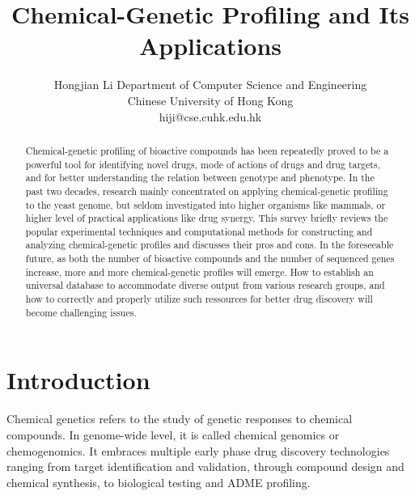 \documentclass[12pt,conference,compsocconf]{../IEEEtran}
\begin{document}
\title{Chemical-Genetic Profiling and Its Applications}
\author
{
\IEEEauthorblockN
{
Hongjian Li
\IEEEauthorblockA
{
Department of Computer Science and Engineering\\
Chinese University of Hong Kong\\
hiji@cse.cuhk.edu.hk
}
}
}
\maketitle

\begin{abstract}

Chemical-genetic profiling of bioactive compounds has been repeatedly proved to be a powerful tool for identifying novel drugs, mode of actions of drugs and drug targets, and for better understanding the relation between genotype and phenotype. In the past two decades, research mainly concentrated on applying chemical-genetic profiling to the yeast genome, but seldom investigated into higher organisms like mammals, or higher level of practical applications like drug synergy. This survey briefly reviews the popular experimental techniques and computational methods for constructing and analyzing chemical-genetic profiles and discusses their pros and cons. In the foreseeable future, as both the number of bioactive compounds and the number of sequenced genes increase, more and more chemical-genetic profiles will emerge. How to establish an universal database to accommodate diverse output from various research groups, and how to correctly and properly utilize such ressources for better drug discovery will become challenging issues.

\end{abstract}




\section{Introduction}

Chemical genetics refers to the study of genetic responses to chemical compounds. In genome-wide level, it is called chemical genomics or chemogenomics. It embraces multiple early phase drug discovery technologies ranging from target identification and validation, through compound design and chemical synthesis, to biological testing and ADME profiling.
\end{document}
